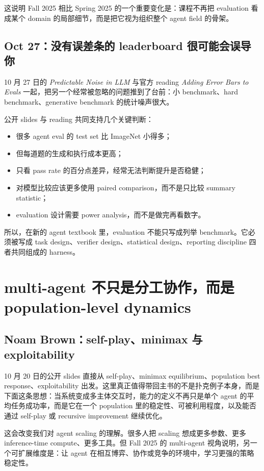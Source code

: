 \documentclass[11pt]{ctexbook}
\begin{document}
这说明 Fall 2025 相比 Spring 2025 的一个重要变化是：课程不再把 evaluation 看成某个 domain 的局部细节，而是把它视为组织整个 agent field 的骨架。

\subsection{Oct 27：没有误差条的 leaderboard 很可能会误导你}

10 月 27 日的 \emph{Predictable Noise in LLM} 与官方 reading \emph{Adding Error Bars to Evals} 一起，把另一个经常被忽略的问题推到了台前：小 benchmark、hard benchmark、generative benchmark 的统计噪声很大。

公开 slides 与 reading 共同支持几个关键判断：

\begin{itemize}
\item 很多 agent eval 的 test set 比 ImageNet 小得多；
\item 但每道题的生成和执行成本更高；
\item 只看 pass rate 的百分点差异，经常无法判断提升是否稳健；
\item 对模型比较应该更多使用 paired comparison，而不是只比较 summary statistic；
\item evaluation 设计需要 power analysis，而不是做完再看数字。
\end{itemize}

所以，在新的 agent textbook 里，evaluation 不能只写成列举 benchmark。它必须被写成 task design、verifier design、statistical design、reporting discipline 四者共同组成的 harness。

\section{multi-agent 不只是分工协作，而是 population-level dynamics}

\subsection{Noam Brown：self-play、minimax 与 exploitability}

10 月 20 日的公开 slides 直接从 self-play、minimax equilibrium、population best response、exploitability 出发。这里真正值得带回主书的不是扑克例子本身，而是下面这条思想：当系统变成多主体交互时，能力的定义不再只是单个 agent 的平均任务成功率，而是它在一个 population 里的稳定性、可被利用程度，以及能否通过 self-play 或 recursive improvement 继续优化。

这会改变我们对 agent scaling 的理解。很多人把 scaling 想成更多参数、更多 inference-time compute、更多工具。但 Fall 2025 的 multi-agent 视角说明，另一个可扩展维度是：让 agent 在相互博弈、协作或竞争的环境中，学习更强的策略稳定性。
\end{document}
